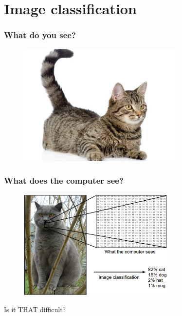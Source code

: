 
\section{Image classification}


\begin{frame}
	\frametitle{What do you see?}

	\centering
      	\begin{figure}
               	\includegraphics[width=0.75\textwidth]{Pics/cat_generic.jpg}
        \end{figure}

\end{frame}

\begin{frame}
        \frametitle{What does the computer see?}

        \centering
        \begin{figure}
                \includegraphics[width=0.7\textwidth]{Pics/cat_computer.png}
        \end{figure}

	Is it THAT difficult?

\end{frame}

